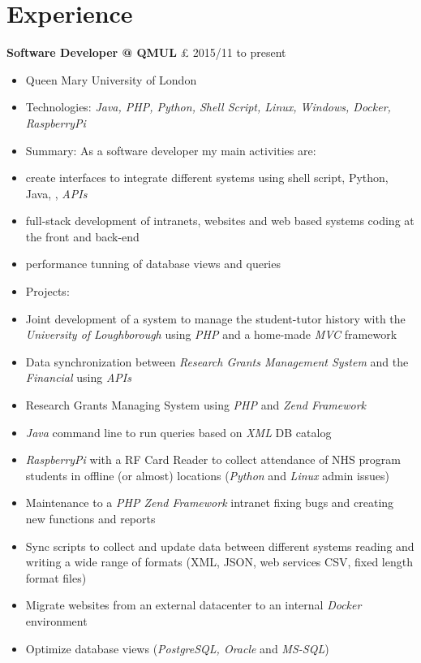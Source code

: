 \documentclass[margin,a4paper]{res}
\begin{document}
{\section{Experience}\label{experience}

\textbf{Software Developer @ QMUL} £ 2015/11 to present

\begin{itemize}
\itemsep1pt\parskip0pt
\item
  Queen Mary University of London
\item
  Technologies: \emph{Java, PHP, Python, Shell Script, Linux, Windows,
  Docker, RaspberryPi}
\item
  Summary: As a software developer my main activities are:
\item
  create interfaces to integrate different systems using shell script,
  Python, Java, , \emph{APIs}
\item
  full-stack development of intranets, websites and web based systems
  coding at the front and back-end
\item
  performance tunning of database views and queries
\item
  Projects:
\item
  Joint development of a system to manage the student-tutor history with
  the \emph{University of Loughborough} using \emph{PHP} and a home-made
  \emph{MVC} framework
\item
  Data synchronization between \emph{Research Grants Management System}
  and the \emph{Financial} using \emph{APIs}
\item
  Research Grants Managing System using \emph{PHP} and \emph{Zend
  Framework}
\item
  \emph{Java} command line to run queries based on \emph{XML} DB catalog
\item
  \emph{RaspberryPi} with a RF Card Reader to collect attendance of NHS
  program students in offline (or almost) locations (\emph{Python} and
  \emph{Linux} admin issues)
\item
  Maintenance to a \emph{PHP Zend Framework} intranet fixing bugs and
  creating new functions and reports
\item
  Sync scripts to collect and update data between different systems
  reading and writing a wide range of formats (XML, JSON, web services
  CSV, fixed length format files)
\item
  Migrate websites from an external datacenter to an internal
  \emph{Docker} environment
\item
  Optimize database views (\emph{PostgreSQL, Oracle} and \emph{MS-SQL})
\end{itemize}

}
\end{document}

